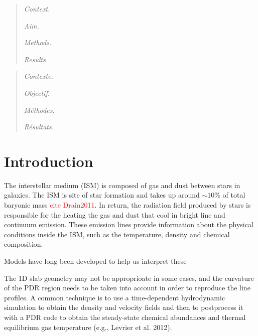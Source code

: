 \documentclass[12pt,a4paper]{article}
\renewcommand*{\thefootnote}{(\arabic{footnote})}
\newcommand{\qt}[1]{\textcolor{red}{#1}}
\begin{document}
\newpage
\thispagestyle{empty}
\vspace*{10em}
{\hypersetup{hidelinks}\large
\tableofcontents
}

\begingroup
\renewcommand{\thefootnote}{}
\endgroup

\newpage
\clearpage
{} 
\begin{abstract}
\normalsize

\textit{Context.} 

\textit{Aim.} 

\textit{Methods.} 

\textit{Results.} 

\end{abstract}

\begin{abstract}
\normalsize
\textit{Contexte.} 

\textit{Objectif.} 

\textit{Méthodes.} 

\textit{Résultats.}
\end{abstract}

\newpage
\section{Introduction}

The interstellar medium (ISM) is composed of gas and dust between stars in galaxies. The ISM is site of star formation and takes up around $\sim 10\%$ of total baryonic mass \qt{cite Drain2011}. In return, the radiation field produced by stars is responsible for the heating the gas and dust that cool in bright line and continuum emission. These emission lines provide information about the physical conditions inside the ISM, such as the temperature, density and chemical composition.

Models have long been developed to help us interpret these


The 1D slab geometry may not be approprioate in some cases, and the curvature of the PDR region needs to be taken into account in order to reproduce the line profiles. A common technique is to use a time-dependent hydrodynamic simulation to obtain the density and velocity fields and then to postprocess it with a PDR code to obtain the steady-state chemical abundances and thermal equilibrium gas temperature (e.g., Levrier et al. 2012).
\end{document}
